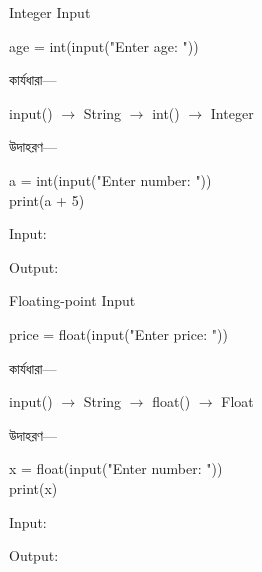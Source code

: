 \noindent
\begin{minipage}[t]{0.49\linewidth}

\begin{examplebox}{Integer Input}

\begin{codebox}
\begin{english}
\ttfamily
age = int(input("Enter age: "))
\end{english}
\end{codebox}

কার্যধারা—

\begin{center}
\textenglish{\ttfamily input()}
\(\longrightarrow\)
String
\(\longrightarrow\)
\textenglish{\ttfamily int()}
\(\longrightarrow\)
Integer
\end{center}

উদাহরণ—

\begin{codebox}
\begin{english}
\ttfamily
a = int(input("Enter number: "))\\
print(a + 5)
\end{english}
\end{codebox}

Input: \textenglish{}

Output: \textenglish{}

\end{examplebox}

\end{minipage}
\hfill
\begin{minipage}[t]{0.49\linewidth}

\begin{examplebox}{Floating-point Input}

\begin{codebox}
\begin{english}
\ttfamily
price = float(input("Enter price: "))
\end{english}
\end{codebox}

কার্যধারা—

\begin{center}
\textenglish{\ttfamily input()}
\(\longrightarrow\)
String
\(\longrightarrow\)
\textenglish{\ttfamily float()}
\(\longrightarrow\)
Float
\end{center}

উদাহরণ—

\begin{codebox}
\begin{english}
\ttfamily
x = float(input("Enter number: "))\\
print(x)
\end{english}
\end{codebox}

Input: \textenglish{}

Output: \textenglish{}

\end{examplebox}

\end{minipage}

